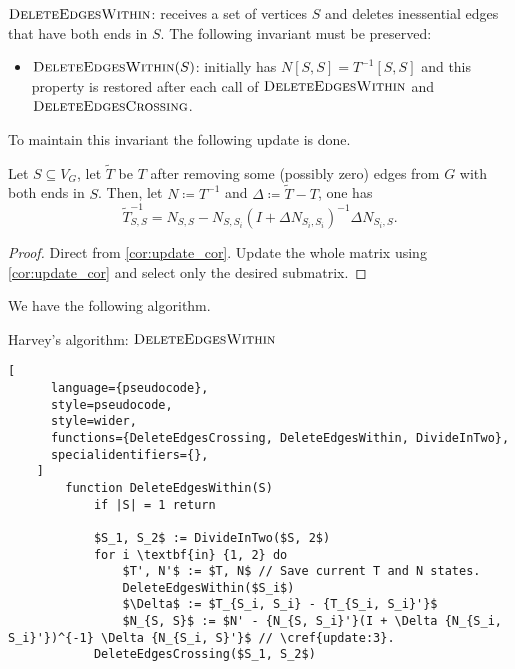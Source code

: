 \(\textsc{DeleteEdgesWithin}\): receives a set of vertices \(S\) and deletes inessential edges that have both ends in \(S\).
The following invariant must be preserved:
\begin{itemize}
  \item \(\textsc{DeleteEdgesWithin}(S)\): initially has \(N[S, S] = T^{-1}[S, S]\) and this property is restored after each call of \(\textsc{DeleteEdgesWithin}\)
    and \(\textsc{DeleteEdgesCrossing}\).
\end{itemize}
To maintain this invariant the following update is done.
\begin{theorem}[Update 3]
\label{update:3}
    Let \(S \subseteq V_G\), let \(\tilde{T}\) be \(T\) after removing some (possibly zero) edges from \(G\) with both ends in \(S\).
    Then, let \(N \coloneqq T^{-1}\) and \(\Delta \coloneqq \tilde{T} - T\), one has
    \[
        {\tilde{T}}^{-1}_{S, S} = N_{S, S} - N_{S, S_i}(I + \Delta N_{S_i, S_i})^{-1} \Delta N_{S_i, S}.
    \]
\end{theorem}

\begin{proof}
    Direct from \cref{cor:update_cor}. Update the whole matrix using \ref{cor:update_cor} and select only the desired submatrix.
\end{proof}

We have the following algorithm.

\begin{programruledcaption}{Harvey's algorithm: \(\textsc{DeleteEdgesWithin}\)}
    \begin{lstlisting}[
      language={pseudocode},
      style=pseudocode,
      style=wider,
      functions={DeleteEdgesCrossing, DeleteEdgesWithin, DivideInTwo},
      specialidentifiers={},
    ]
        function DeleteEdgesWithin(S)
            if |S| = 1 return

            $S_1, S_2$ := DivideInTwo($S, 2$)
            for i \textbf{in} {1, 2} do
                $T', N'$ := $T, N$ // Save current T and N states.
                DeleteEdgesWithin($S_i$)
                $\Delta$ := $T_{S_i, S_i} - {T_{S_i, S_i}'}$
                $N_{S, S}$ := $N' - {N_{S, S_i}'}(I + \Delta {N_{S_i, S_i}'})^{-1} \Delta {N_{S_i, S}'}$ // \cref{update:3}. 
            DeleteEdgesCrossing($S_1, S_2$)
    \end{lstlisting}
\end{programruledcaption}

